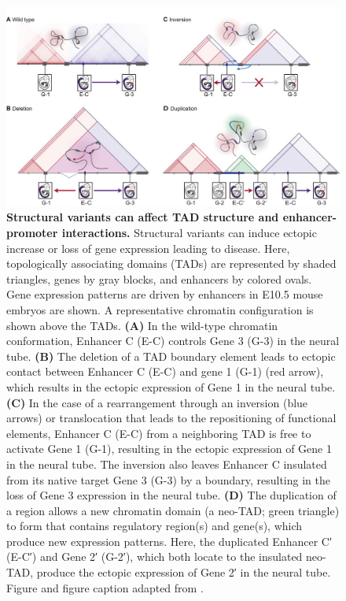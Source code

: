 \documentclass[a4paper,twoside=true,openright,parskip=full,chapterprefix=true,11pt,headings=normal,bibliography=totoc,listof=totoc,titlepage=on,captions=tableabove,draft=false]{scrreprt}
\theoremstyle{definition}
\theoremstyle{definition}
\theoremstyle{definition}
\theoremstyle{remark}
\begin{document}
\begin{figure}

{\centering \includegraphics[width=1\linewidth]{figures/Andrey2017_Fig5} 

}

\caption{\textbf{Structural variants can affect TAD
structure and enhancer-promoter interactions.} Structural variants can
induce ectopic increase or loss of gene expression leading to disease.
Here, topologically associating domains (TADs) are represented by shaded
triangles, genes by gray blocks, and enhancers by colored ovals. Gene
expression patterns are driven by enhancers in E10.5 mouse embryos are
shown. A representative chromatin configuration is shown above the TADs.
\textbf{(A)} In the wild-type chromatin conformation, Enhancer C (E-C)
controls Gene 3 (G-3) in the neural tube. \textbf{(B)} The deletion of a
TAD boundary element leads to ectopic contact between Enhancer C (E-C)
and gene 1 (G-1) (red arrow), which results in the ectopic expression of
Gene 1 in the neural tube. \textbf{(C)} In the case of a rearrangement
through an inversion (blue arrows) or translocation that leads to the
repositioning of functional elements, Enhancer C (E-C) from a
neighboring TAD is free to activate Gene 1 (G-1), resulting in the
ectopic expression of Gene 1 in the neural tube. The inversion also
leaves Enhancer C insulated from its native target Gene 3 (G-3) by a
boundary, resulting in the loss of Gene 3 expression in the neural tube.
\textbf{(D)} The duplication of a region allows a new chromatin domain
(a neo-TAD; green triangle) to form that contains regulatory region(s)
and gene(s), which produce new expression patterns. Here, the duplicated
Enhancer C′ (E-C′) and Gene 2′ (G-2′), which both locate to the
insulated neo-TAD, produce the ectopic expression of Gene 2′ in the
neural tube. Figure and figure caption adapted from \citep{Andrey2017}.}\label{fig:TadDisruptions}
\end{figure}
\end{document}

